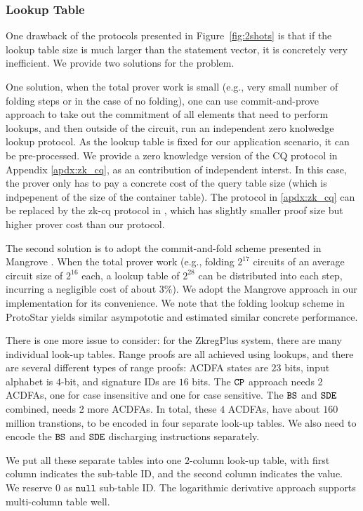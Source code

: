 \subsubsection{Lookup Table}
One drawback of the protocols presented in Figure\ \ref{fig:2shots}
is that if the lookup table size is much larger than the
statement vector, it is concretely very inefficient. We provide
two solutions for the problem. 

One solution, when the total
prover work is small (e.g., very small number of folding steps
or in the case of no folding), one can use commit-and-prove approach
to take out the commitment of all elements that need to perform
lookups, and then outside of the circuit, run an independent
zero knolwedge lookup protocol. As the lookup table is fixed for
our application scenario, it can be pre-processed. We provide
a zero knowledge version of the CQ protocol \cite{cq} in Appendix 
\ref{apdx:zk_cq}, as an contribution of independent interst.
In this case, the prover only has to pay a concrete cost
of the query table size (which is indpepenent of the size of
the container table). The protocol in \ref{apdx:zk_cq}
can be replaced by the zk-cq protocol in \cite{MatrixLookup},
which has slightly smaller proof size but higher prover cost than our
protocol.

The second solution is to adopt the commit-and-fold scheme presented in 
Mangrove \cite{Mangrove}. When the total prover work (e.g., folding
$2^{17}$ circuits of an average circuit size of $2^{16}$ each,
a lookup table of $2^{28}$ can be distributed into each step, 
incurring a negligible cost of about $3\%$). We adopt the Mangrove approach
in our implementation for its convenience. 
We note that the folding lookup scheme in ProtoStar \cite{ProtoStar} yields
similar asympototic and estimated similar concrete performance.

There is one more issue to consider: for the ZkregPlus system,
there are many individual look-up tables. Range proofs are all
achieved using lookups, and there are several different
types of range proofs: ACDFA states are $23$ bits,
input alphabet is $4$-bit, and signature IDs are $16$ bits.
The $\texttt{CP}$ approach needs 2 ACDFAs, one for case insensitive and
one for case sensitive. The $\texttt{BS}$ and $\texttt{SDE}$ combined,
needs 2 more ACDFAs.  In total, these $4$ ACDFAs, have
about $160$ million transtions, to be encoded in four separate
look-up tables. We also need to encode the $\texttt{BS}$ and $\texttt{SDE}$
discharging instructions separately.  

We put all these separate tables into one $2$-column look-up table,
with first column indicates the sub-table ID, and the second column
indicates the value. We reserve $0$ as $\texttt{null}$
sub-table ID. The logarithmic derivative approach 
\cite{Hab22,cq,ProtoStar} supports multi-column table well.

